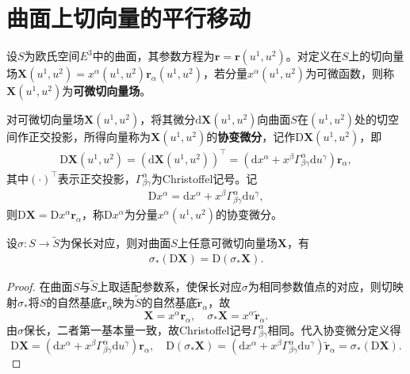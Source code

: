 \documentclass[../../main.tex]{subfiles}%
\begin{document}
\section{曲面上切向量的平行移动}

\begin{definition}
设$S$为欧氏空间$E^3$中的曲面，其参数方程为$\boldsymbol{r}=\boldsymbol{r}(u^1,u^2)$。对定义在$S$上的切向量场$\boldsymbol{X}(u^1,u^2)=x^\alpha(u^1,u^2)\boldsymbol{r}_\alpha(u^1,u^2)$，若分量$x^\alpha(u^1,u^2)$为可微函数，则称$\boldsymbol{X}(u^1,u^2)$为\textbf{可微切向量场}。
\end{definition}

\begin{definition}
对可微切向量场$\boldsymbol{X}(u^1,u^2)$，将其微分$\mathrm{d}\boldsymbol{X}(u^1,u^2)$向曲面$S$在$(u^1,u^2)$处的切空间作正交投影，所得向量称为$\boldsymbol{X}(u^1,u^2)$的\textbf{协变微分}，记作$\mathrm{D}\boldsymbol{X}(u^1,u^2)$，即
\begin{align}
\mathrm{D}\boldsymbol{X}(u^1,u^2)=(\mathrm{d}\boldsymbol{X}(u^1,u^2))^\top=(\mathrm{d}x^\alpha+x^\beta\Gamma_{\beta\gamma}^\alpha\mathrm{d}u^\gamma)\boldsymbol{r}_\alpha,
\label{eq:cov_diff_vec}
\end{align}
其中$(\cdot)^\top$表示正交投影，$\Gamma_{\beta\gamma}^\alpha$为Christoffel记号。记
\begin{align}
\mathrm{D}x^\alpha=\mathrm{d}x^\alpha+x^\beta\Gamma_{\beta\gamma}^\alpha\mathrm{d}u^\gamma,
\label{eq:cov_diff_comp}
\end{align}
则$\mathrm{D}\boldsymbol{X}=\mathrm{D}x^\alpha \boldsymbol{r}_\alpha$，称$\mathrm{D}x^\alpha$为分量$x^\alpha(u^1,u^2)$的协变微分。
\end{definition}

\begin{theorem}
设$\sigma:S\to\tilde{S}$为保长对应，则对曲面$S$上任意可微切向量场$\boldsymbol{X}$，有
\begin{align}
\sigma_*(\mathrm{D}\boldsymbol{X})=\mathrm{D}(\sigma_*\boldsymbol{X}).
\label{eq:cov_diff_isometry}
\end{align}
\end{theorem}

\begin{proof}
在曲面$S$与$\tilde{S}$上取适配参数系，使保长对应$\sigma$为相同参数值点的对应，则切映射$\sigma_*$将$S$的自然基底$\boldsymbol{r}_\alpha$映为$\tilde{S}$的自然基底$\tilde{\boldsymbol{r}}_\alpha$，故
\[
\boldsymbol{X}=x^\alpha\boldsymbol{r}_\alpha,\quad \sigma_*\boldsymbol{X}=x^\alpha\tilde{\boldsymbol{r}}_\alpha.
\]
由$\sigma$保长，二者第一基本量一致，故Christoffel记号$\Gamma_{\beta\gamma}^\alpha$相同。代入协变微分定义得
\[
\mathrm{D}\boldsymbol{X}=(\mathrm{d}x^\alpha+x^\beta\Gamma_{\beta\gamma}^\alpha\mathrm{d}u^\gamma)\boldsymbol{r}_\alpha,\quad \mathrm{D}(\sigma_*\boldsymbol{X})=(\mathrm{d}x^\alpha+x^\beta\Gamma_{\beta\gamma}^\alpha\mathrm{d}u^\gamma)\tilde{\boldsymbol{r}}_\alpha=\sigma_*(\mathrm{D}\boldsymbol{X}).
\]
\end{proof}
\end{document}
